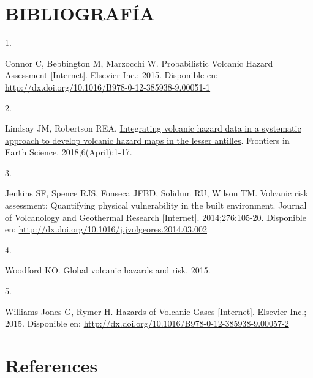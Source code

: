 \documentclass[
  spanish,
  letterpaper,
]{book}
\newlength{\cslhangindent}
\newlength{\csllabelwidth}
\newenvironment{CSLReferences}[2] %
 {\begin{list}{}{%
  \setlength{\itemindent}{0pt}
  \setlength{\leftmargin}{0pt}
  \setlength{\parsep}{0pt}
  \ifodd #1
   \setlength{\leftmargin}{\cslhangindent}
   \setlength{\itemindent}{-1\cslhangindent}
  \fi
  \setlength{\itemsep}{#2\baselineskip}}}
 {\end{list}}
\newcommand{\CSLLeftMargin}[1]{\parbox[t]{\csllabelwidth}{\strut#1\strut}}
\newcommand{\CSLRightInline}[1]{\parbox[t]{\linewidth - \csllabelwidth}{\strut#1\strut}}
\begin{document}
\chapter{BIBLIOGRAFÍA}\label{bibliografuxeda}

\label{refs}
\begin{CSLReferences}{0}{1}
\CSLLeftMargin{1. }%
\CSLRightInline{Connor C, Bebbington M, Marzocchi W. Probabilistic
Volcanic Hazard Assessment {[}Internet{]}. Elsevier Inc.; 2015.
Disponible en:
\url{http://dx.doi.org/10.1016/B978-0-12-385938-9.00051-1}}

\CSLLeftMargin{2. }%
\CSLRightInline{Lindsay JM, Robertson REA.
\href{https://doi.org/10.3389/feart.2018.00042}{Integrating volcanic
hazard data in a systematic approach to develop volcanic hazard maps in
the lesser antilles}. Frontiers in Earth Science. 2018;6(April):1-17. }

\CSLLeftMargin{3. }%
\CSLRightInline{Jenkins SF, Spence RJS, Fonseca JFBD, Solidum RU, Wilson
TM. Volcanic risk assessment: Quantifying physical vulnerability in the
built environment. Journal of Volcanology and Geothermal Research
{[}Internet{]}. 2014;276:105-20. Disponible en:
\url{http://dx.doi.org/10.1016/j.jvolgeores.2014.03.002}}

\CSLLeftMargin{4. }%
\CSLRightInline{Woodford KO. Global volcanic hazards and risk. 2015. }

\CSLLeftMargin{5. }%
\CSLRightInline{Williams-Jones G, Rymer H. Hazards of Volcanic Gases
{[}Internet{]}. Elsevier Inc.; 2015. Disponible en:
\url{http://dx.doi.org/10.1016/B978-0-12-385938-9.00057-2}}

\end{CSLReferences}


\chapter*{References}\label{references}

\end{document}

